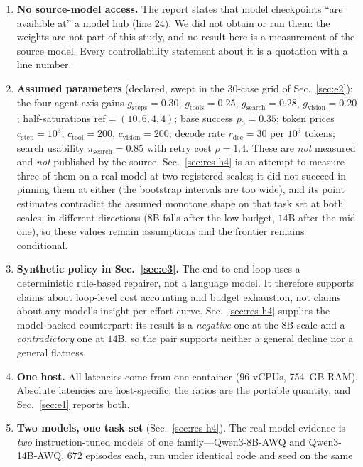 \documentclass[10pt]{article} %
\begin{document}
\begin{enumerate}
\item \textbf{No source-model access.} The report states that model checkpoints
  ``are available at'' a model hub (line 24). We did not obtain or run them: the
  weights are not part of this study, and no result here is a measurement of the
  source model. Every controllability statement about it is a quotation with a
  line number.
\item \textbf{Assumed parameters} (declared, swept in the $30$-case grid of
  Sec.~\ref{sec:e2}): the four agent-axis gains
  $g_{\mathrm{steps}}{=}0.30$, $g_{\mathrm{tools}}{=}0.25$,
  $g_{\mathrm{search}}{=}0.28$, $g_{\mathrm{vision}}{=}0.20$; half-saturations
  $\mathrm{ref}{=}(10,6,4,4)$; base success $p_0{=}0.35$; token prices
  $c_{\mathrm{step}}{=}10^3$, $c_{\mathrm{tool}}{=}200$,
  $c_{\mathrm{vision}}{=}200$; decode rate $r_{\mathrm{dec}}{=}30$ per $10^3$
  tokens; search usability $\pi_{\mathrm{search}}{=}0.85$ with retry cost
  $\rho{=}1.4$. These are \emph{not} measured and \emph{not} published by the
  source. Sec.~\ref{sec:res-h4} is an attempt to measure three of them on a real
  model at two registered scales; it did not succeed in pinning them at either
  (the bootstrap intervals are too wide), and its point estimates contradict the
  assumed monotone shape on that task set at both scales, in different directions
  ($8$B falls after the low budget, $14$B after the mid one), so these values
  remain assumptions and the frontier remains conditional.
\item \textbf{Synthetic policy in Sec.~\ref{sec:e3}.} The end-to-end loop uses a
  deterministic rule-based repairer, not a language model. It therefore supports
  claims about loop-level cost accounting and budget exhaustion, not claims about
  any model's insight-per-effort curve. Sec.~\ref{sec:res-h4} supplies the
  model-backed counterpart: its result is a \emph{negative} one at the $8$B scale and
  a \emph{contradictory} one at $14$B, so the pair supports neither a general decline
  nor a general flatness.
\item \textbf{One host.} All latencies come from one container (96 vCPUs,
  754~GB RAM). Absolute latencies are host-specific; the ratios are the portable
  quantity, and Sec.~\ref{sec:e1} reports both.
\item \textbf{Two models, one task set} (Sec.~\ref{sec:res-h4}). The real-model
  evidence is \emph{two} instruction-tuned models of one family---Qwen3-8B-AWQ and
  Qwen3-14B-AWQ, $672$ episodes each, run under identical code and seed on the same

\end{enumerate}
\end{document}
